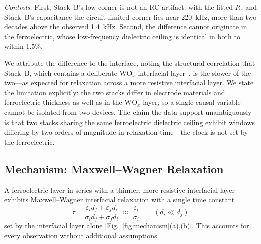 \documentclass[journal]{IEEEtran}
\begin{document}
\textit{Controls.} First, Stack~B's low corner is not an RC artifact: with
the fitted $R_s$ and Stack~B's capacitance the circuit-limited corner lies
near 220~kHz, more than two decades above the observed 1.4~kHz. Second, the
difference cannot originate in the ferroelectric, whose low-frequency
dielectric ceiling is identical in both to within 1.5\%.

We attribute the difference to the interface, noting the structural
correlation that Stack~B, which contains a deliberate WO$_x$ interfacial
layer~\cite{paul2026wox}, is the slower of the two---as expected for
relaxation across a more resistive interfacial layer. We state the limitation
explicitly: the two stacks differ in electrode materials and ferroelectric
thickness as well as in the WO$_x$ layer, so a single causal variable cannot
be isolated from two devices. The claim the data support unambiguously is
that two stacks sharing the same ferroelectric dielectric ceiling exhibit
windows differing by two orders of magnitude in relaxation time---the clock
is not set by the ferroelectric.

\subsection{Mechanism: Maxwell--Wagner Relaxation}
A ferroelectric layer in series with a thinner, more resistive interfacial
layer exhibits Maxwell--Wagner interfacial relaxation with a single time
constant~\cite{jonscher1983,kremer2003}
\begin{equation}
\tau = \frac{\varepsilon_i d_f + \varepsilon_f d_i}
            {\sigma_i d_f + \sigma_f d_i}
     \;\approx\; \frac{\varepsilon_i}{\sigma_i}
     \qquad (d_i \ll d_f)
\label{eq:mw}
\end{equation}
set by the interfacial layer alone [Fig.~\ref{fig:mechanism}(a),(b)]. This
accounts for every observation without additional assumptions.
\end{document}
